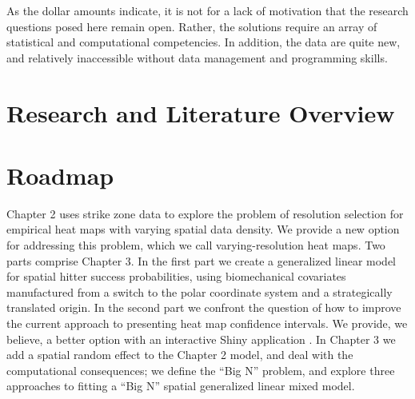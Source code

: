 As the dollar amounts indicate, it is not for a lack of motivation that the research questions posed here remain open. Rather, the solutions require an array of statistical and computational competencies. In addition, the data are quite new, and relatively inaccessible without data management and programming skills.


\section{Research and Literature Overview}

\section{Roadmap}


Chapter 2 uses strike zone data to explore the problem of resolution selection for empirical heat maps with varying spatial data density. We provide a new option for addressing this problem, which we call varying-resolution heat maps. Two parts comprise Chapter 3. In the first part we create a generalized linear model for spatial hitter success probabilities, using biomechanical covariates manufactured from a switch to the polar coordinate system and a strategically translated origin. In the second part we confront the question of how to improve the current approach to presenting heat map confidence intervals. We provide, we believe, a better option with an interactive Shiny application \citep{Shiny}. In Chapter 3 we add a spatial random effect to the Chapter 2 model, and deal with the computational consequences; we define the ``Big N'' problem, and explore three approaches to fitting a ``Big N'' spatial generalized linear mixed model. 
